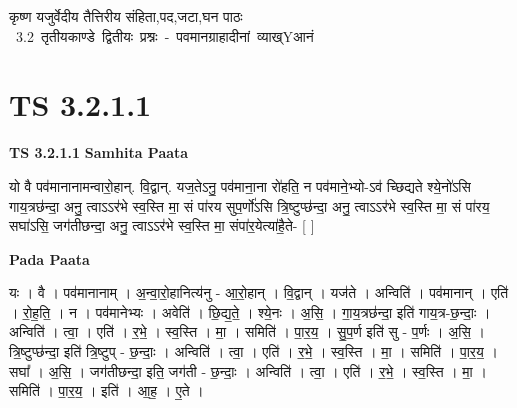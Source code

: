\documentclass[17pt]{extarticle}
\begin{document}
\begin{titlepage}
    \begin{center}
 
\begin{sanskrit}
    { \Large
    कृष्ण यजुर्वेदीय तैत्तिरीय संहिता,पद,जटा,घन पाठः 
    }
    \\
    \vspace{2.5cm}
    \mbox{ \Large
    3.2     तृतीयकाण्डे द्वितीयः प्रश्नः - पवमानग्राहादीनां व्याख्Yआनं   }
\end{sanskrit}
\end{center}

\end{titlepage}
\tableofcontents
{}
\pagebreak


\section{ TS 3.2.1.1 }

\textbf{TS 3.2.1.1 } \newline
\textbf{Samhita Paata} \newline

यो वै पव॑मानानामन्वारो॒हान्. वि॒द्वान्. यज॒तेऽनु॒ पव॑माना॒ना रो॑हति॒ न पव॑माने॒भ्यो-ऽव॑ च्छिद्यते श्ये॒नो॑ऽसि गाय॒त्रछ॑न्दा॒ अनु॒ त्वाऽऽर॑भे स्व॒स्ति मा॒ सं पा॑रय सुप॒र्णो॑ऽसि त्रि॒ष्टुप्छ॑न्दा॒ अनु॒ त्वाऽऽर॑भे स्व॒स्ति मा॒ सं पा॑रय॒ सघा॑ऽसि॒ जग॑तीछन्दा॒ अनु॒ त्वाऽऽर॑भे स्व॒स्ति मा॒ संपा॑र॒येत्या॑है॒ते- [  ] \newline

\textbf{Pada Paata} \newline

यः । वै । पव॑मानानाम् । अ॒न्वा॒रो॒हानित्य॑नु - आ॒रो॒हान् । वि॒द्वान् । यज॑ते । अन्विति॑ । पव॑मानान् । एति॑ । रो॒ह॒ति॒ । न । पव॑मानेभ्यः । अवेति॑ । छि॒द्य॒ते॒ । श्ये॒नः । अ॒सि॒ । गा॒य॒त्रछ॑न्दा॒ इति॑ गाय॒त्र-छ॒न्दाः॒ । अन्विति॑ । त्वा॒ । एति॑ । र॒भे॒ । स्व॒स्ति । मा॒ । समिति॑ । पा॒र॒य॒ । सु॒प॒र्ण इति॑ सु - प॒र्णः । अ॒सि॒ । त्रि॒ष्टुप्छ॑न्दा॒ इति॑ त्रि॒ष्टुप् - छ॒न्दाः॒ । अन्विति॑ । त्वा॒ । एति॑ । र॒भे॒ । स्व॒स्ति । मा॒ । समिति॑ । पा॒र॒य॒ । सघा᳚ । अ॒सि॒ । जग॑तीछन्दा॒ इति॒ जग॑ती - छ॒न्दाः॒ । अन्विति॑ । त्वा॒ । एति॑ । र॒भे॒ । स्व॒स्ति । मा॒ । समिति॑ । पा॒र॒य॒ । इति॑ । आ॒ह॒ । ए॒ते ।  \newline




\end{document}
